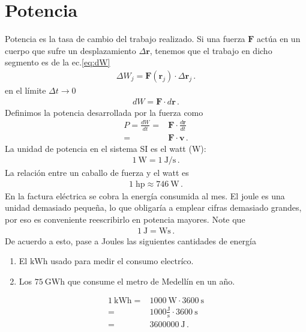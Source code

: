   
\section{Potencia}
Potencia es la tasa de cambio del trabajo realizado. Si una fuerza $\mathbf{F}$ actúa en un cuerpo que sufre un desplazamiento $\Delta\mathbf{r}$, tenemos que el trabajo en dicho segmento es de la ec.\eqref{eq:dW}
\begin{align}
  \Delta W_j=\mathbf{F}(\mathbf{r}_j)\cdot \Delta \mathbf{r}_j\,.
\end{align}
en el límite $\Delta t\to 0$
\begin{align}
  dW=\mathbf{F}\cdot d\mathbf{r}\,.
\end{align}
Definimos la potencia desarrollada por la fuerza como
\begin{align}
  P=\frac{dW}{dt}=&\mathbf{F}\cdot \frac{d\mathbf{r}}{dt}\nonumber\\
=&\mathbf{F}\cdot \mathbf{v}\,.
\end{align}
La unidad de potencia en el sistema SI es el watt (W):
\begin{align}
  \SI{1}{\watt}=\SI{1}{\joule\per\second}\,.
\end{align}
La relación entre un caballo de fuerza y el watt es
\begin{align}
  1\;\text{hp}\approx \SI{746}{\watt}\,.
\end{align}
\example{} 
En la factura eléctrica se cobra la energía consumida al
mes.  El joule es una unidad demasiado pequeña, lo que obligaría a
emplear cifras demasiado grandes, por eso es conveniente reescribirlo
en potencia mayores. Note que
\begin{align}
  \SI{1}{\joule}=\si{\watt\second}\,.
\end{align}
De acuerdo a esto, pase a Joules las siguientes cantidades de energía
\begin{enumerate}
\item El $\si{\kilo\watt\hour}$ usado para medir el consumo electríco.
\item Los $\SI{75}{\giga\watt\hour}$ que consume el metro de Medellín en un año. 
\end{enumerate}
\begin{align*}
  \SI{1}{\kilo\watt\hour}=&\SI{1000}{\watt}\cdot \SI{3600}{\second}\nonumber\\
  =&1000\frac{\si{\joule}}{\si{\second}}\cdot \SI{3600}{\second}\nonumber\\
  =&\SI{3600000}{\joule} \,.
\end{align*}

